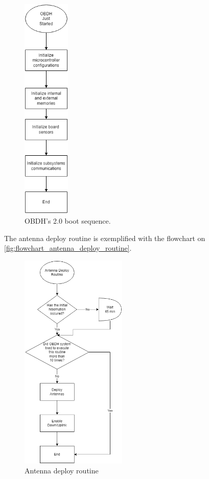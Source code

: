 \begin{figure}[!ht]
    \begin{center}
        \includegraphics[width=0.2\textwidth]{figures/flowchart_obdh_boot_sequence.drawio.png}
        \caption{OBDH's 2.0 boot sequence.}
        \label{fig:flowchart_obdh_boot_sequence}
    \end{center}
\end{figure}

The antenna deploy routine is exemplified with the flowchart on \autoref{fig:flowchart_antenna_deploy_routine}.

\begin{figure}[!ht]
    \begin{center}
        \includegraphics[width=0.45\textwidth]{figures/flowchart_antenna_deploy_routine.png}
        \caption{Antenna deploy routine}
        \label{fig:flowchart_antenna_deploy_routine}
    \end{center}
\end{figure}

